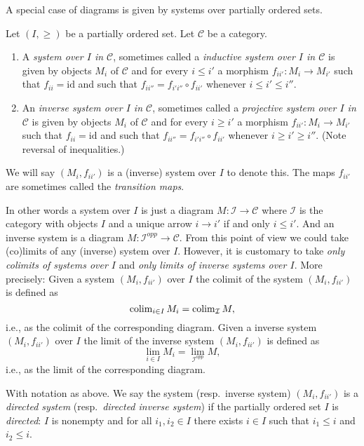 \noindent
A special case of diagrams is given by systems over partially ordered sets.

\begin{definition}
\label{definition-system-over-poset}
Let $(I, \geq)$ be a partially ordered set.
Let $\mathcal{C}$ be a category.
\begin{enumerate}
\item A {\it system over $I$ in $\mathcal{C}$}, sometimes called a
{\it inductive system over $I$ in $\mathcal{C}$} is given by
objects $M_i$ of $\mathcal{C}$ and for every $i \leq i'$ a
morphism $f_{ii'} : M_i \to M_{i'}$ such that $f_{ii}
= \text{id}$ and such that $f_{ii''} = f_{i'i''} \circ f_{i i'}$
whenever $i \leq i' \leq i''$.
\item An {\it inverse system over $I$ in $\mathcal{C}$},
sometimes called a {\it projective system over $I$ in $\mathcal{C}$}
is given by objects $M_i$ of $\mathcal{C}$ and for every $i \geq i'$ a
morphism $f_{ii'} : M_i \to M_{i'}$ such that $f_{ii}
= \text{id}$ and such that $f_{ii''} = f_{i'i''} \circ f_{i i'}$
whenever $i \geq i' \geq i''$. (Note reversal of inequalities.)
\end{enumerate}
We will say $(M_i, f_{ii'})$ is a (inverse) system over $I$ to
denote this. The maps $f_{ii'}$ are sometimes
called the {\it transition maps}.
\end{definition}

\noindent
In other words a system over $I$ is just a diagram
$M : \mathcal{I} \to \mathcal{C}$ where $\mathcal{I}$ is the category with
objects $I$ and a unique arrow $i \to i'$ if and only
$i \leq i'$. And an inverse system is a diagram
$M : \mathcal{I}^{opp} \to \mathcal{C}$.
From this point of view we could take (co)limits of any (inverse)
system over $I$. However, it is customary to take
{\it only colimits of systems over $I$} and
{\it only limits of inverse systems over $I$}.
More precisely: Given a system $(M_i, f_{ii'})$
over $I$ the colimit of the system
$(M_i, f_{ii'})$ is defined as
$$
\mathop{\rm colim}\nolimits_{i \in I} M_i = \mathop{\rm colim}\nolimits_{\mathcal{I}} M,
$$
i.e., as the colimit of the corresponding diagram.
Given a inverse system $(M_i, f_{ii'})$ over $I$ the limit
of the inverse system $(M_i, f_{ii'})$ is defined as
$$
\lim_{i \in I} M_i = \lim_{\mathcal{I}^{opp}} M,
$$
i.e., as the limit of the corresponding diagram. 

\begin{definition}
\label{definition-directed-system}
With notation as above.
We say the system (resp.\ inverse system) $(M_i, f_{ii'})$ is a
{\it directed system} (resp.\ {\it directed inverse system})
if the partially ordered set $I$ is {\it directed}: $I$ is nonempty and
for all $i_1, i_2 \in I$ there exists $i\in I$ such that
$i_1 \leq i$ and $i_2 \leq i$.
\end{definition}

